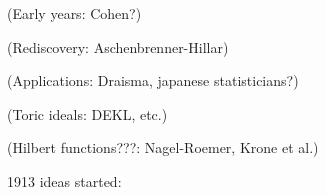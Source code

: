 (Early years: Cohen?)

(Rediscovery: Aschenbrenner-Hillar)

(Applications: Draisma, japanese statisticians?)

(Toric ideals: DEKL, etc.)

(Hilbert functions???: Nagel-Roemer, Krone et al.)


\cite{renschuch2003contributions}



\cite{aschenbrenner2008algorithm}

1913 ideas started: \cite{gunther1941modules}


\cite{cohen1967laws}
\cite{Cohen87}

\cite{hillar2012finite}
\cite{Hillar13}
\cite{hillar2016corrigendum}